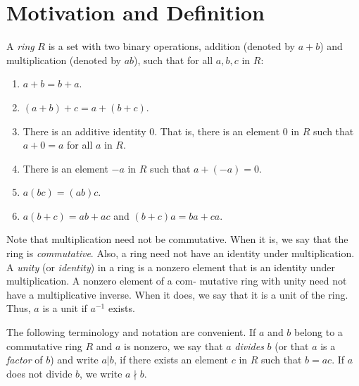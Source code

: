 \section{Motivation and Definition}

\begin{definition}[Ring]
	A \textit{ring} $R$ is a set with two binary operations, addition (denoted by $a + b$) and multiplication (denoted by $ab$), such that for all $a,b,c$ in $R$:
	\begin{enumerate}
		\item $a + b = b + a$.
		\item $(a + b) + c = a + (b + c)$.
		\item There is an additive identity 0. That is, there is an element 0 in $R$ such that $a + 0 = a$ for all $a$ in $R$.
		\item There is an element $-a$ in $R$ such that $a + (-a) = 0$.
		\item $a(bc) = (ab)c$.
		\item $a(b+c) = ab + ac$ and $(b + c)a = ba + ca$.
	\end{enumerate}
\end{definition}

\begin{remark}
	Note that multiplication need not be commutative. When it is, we say that the ring is \textit{commutative}. Also, a ring need not have an identity under multiplication. A \textit{unity} (or \textit{identity}) in a ring is a nonzero element that is an identity under multiplication. A nonzero element of a com-
	mutative ring with unity need not have a multiplicative inverse. When it does, we say that it is a unit of the ring. Thus, $a$ is a unit if $a^{-1}$ exists.

	\noindent The following terminology and notation are convenient. If $a$ and $b$ belong to a commutative ring $R$ and $a$ is nonzero, we say that $a$ \textit{divides} $b$ (or that $a$ is a \textit{factor} of $b$) and write $a \vert b$, if there exists an element $c$ in $R$ such that $b = ac$. If $a$ does not divide $b$, we write $a \nmid b$.
\end{remark}
